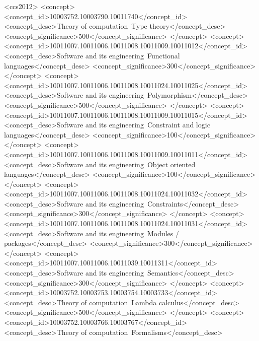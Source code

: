 \documentclass[natbib=false]{jfp}
\begin{document}
\begin{CCSXML}
  <ccs2012>
     <concept>
         <concept_id>10003752.10003790.10011740</concept_id>
         <concept_desc>Theory of computation~Type theory</concept_desc>
         <concept_significance>500</concept_significance>
         </concept>
     <concept>
         <concept_id>10011007.10011006.10011008.10011009.10011012</concept_id>
         <concept_desc>Software and its engineering~Functional languages</concept_desc>
         <concept_significance>300</concept_significance>
         </concept>
     <concept>
         <concept_id>10011007.10011006.10011008.10011024.10011025</concept_id>
         <concept_desc>Software and its engineering~Polymorphism</concept_desc>
         <concept_significance>500</concept_significance>
         </concept>
     <concept>
         <concept_id>10011007.10011006.10011008.10011009.10011015</concept_id>
         <concept_desc>Software and its engineering~Constraint and logic languages</concept_desc>
         <concept_significance>100</concept_significance>
         </concept>
     <concept>
         <concept_id>10011007.10011006.10011008.10011009.10011011</concept_id>
         <concept_desc>Software and its engineering~Object oriented languages</concept_desc>
         <concept_significance>100</concept_significance>
         </concept>
     <concept>
         <concept_id>10011007.10011006.10011008.10011024.10011032</concept_id>
         <concept_desc>Software and its engineering~Constraints</concept_desc>
         <concept_significance>300</concept_significance>
         </concept>
     <concept>
         <concept_id>10011007.10011006.10011008.10011024.10011031</concept_id>
         <concept_desc>Software and its engineering~Modules / packages</concept_desc>
         <concept_significance>300</concept_significance>
         </concept>
     <concept>
         <concept_id>10011007.10011006.10011039.10011311</concept_id>
         <concept_desc>Software and its engineering~Semantics</concept_desc>
         <concept_significance>300</concept_significance>
         </concept>
     <concept>
         <concept_id>10003752.10003753.10003754.10003733</concept_id>
         <concept_desc>Theory of computation~Lambda calculus</concept_desc>
         <concept_significance>500</concept_significance>
         </concept>
     <concept>
         <concept_id>10003752.10003766.10003767</concept_id>
         <concept_desc>Theory of computation~Formalisms</concept_desc>

\end{CCSXML}
\end{document}
